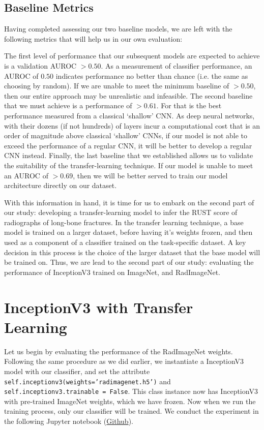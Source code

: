 \subsection{Baseline Metrics}

Having completed assessing our two baseline models, we are left with the following metrics that will help us in our own evaluation:



\noindent
The first level of performance that our subsequent models are expected to achieve is a validation AUROC \(> 0.50\). As a measurement of classifier performance, an AUROC of \(0.50\) indicates performance no better than chance (i.e. the same as choosing by random). If we are unable to meet the minimum baseline of \(> 0.50\), then our entire approach may be unrealistic and infeasible. The second baseline that we must achieve is a performance of \(> 0.61\). For that is the best performance measured from a classical \enquote*{shallow} CNN. As deep neural networks, with their dozens (if not hundreds) of layers incur a computational cost that is an order of magnitude above classical \enquote*{shallow} CNNs, if our model is not able to exceed the performance of a regular CNN, it will be better to develop a regular CNN instead. Finally, the last baseline that we established allows us to validate the suitability of the transfer-learning technique. If our model is unable to meet an AUROC of \(> 0.69\), then we will be better served to train our model architecture directly on our dataset.

With this information in hand, it is time for us to embark on the second part of our study: developing a transfer-learning model to infer the RUST score of radiographs of long-bone fractures. In the transfer learning technique, a base model is trained on a larger dataset, before having it's weights frozen, and then used as a component of a classifier trained on the task-specific dataset. A key decision in this process is the choice of the larger dataset that the base model will be trained on. Thus, we are lead to the second part of our study: evaluating the performance of InceptionV3 trained on ImageNet, and RadImageNet.

\section{InceptionV3 with Transfer Learning}

Let us begin by evaluating the performance of the RadImageNet weights. Following the same procedure as we did earlier, we instantiate a InceptionV3 model with our classifier, and set the attribute \texttt{self.inceptionv3(weights='radimagenet.h5')} and \texttt{self.inceptionv3.trainable = False}. This class instance now has InceptionV3 with pre-trained ImageNet weights, which we have frozen. Now when we run the training process, only our classifier will be trained. We conduct the experiment in the following Jupyter notebook (\href{https://github.com/ShenZhouHong/radiography-ai-project/blob/8d295305fbf9e8a7d1993e4564731e3f3f113f2d/python/initial-evaluation/inceptionv3-radimgnet.ipynb}{Github}).

